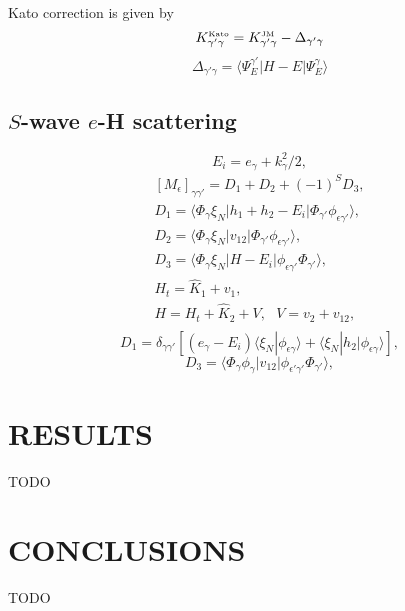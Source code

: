 \documentclass[aip
, pra
, showpacs
, aps
, twocolumn
, groupedaddress
, floatfix
]{revtex4}
\newcommand{\beq}{\begin{equation}}
\newcommand{\eeq}{\end{equation}}
\newcommand{\barr}{\begin{array}}
\newcommand{\earr}{\end{array}}
\newcommand{\JM}{\mbox{\tiny{JM}}}
\newcommand{\Kato}{\mbox{\tiny{Kato}}}
\begin{document}
Kato correction is given by
\beq
K_{\gamma' \gamma}^{\Kato} = K_{\gamma' \gamma}^{\JM} - \Delta_{\gamma' \gamma}
\eeq
\beq
\Delta_{\gamma' \gamma} = \langle \Psi_E^{\gamma'}  |H-E| \Psi_E^\gamma \rangle
\eeq

\subsection{$S$-wave $e$-H scattering}
\beq
E_i = e_\gamma + k^2_\gamma/2,
\eeq
\beq \barr{l}
[M_{\epsilon}]_{\gamma \gamma'} = D_1 + D_2 + (-1)^S D_3,\\
D_1 = \langle \Phi_\gamma \xi_{N}  | h_1 + h_2-E_i |
\Phi_{\gamma'} \phi_{\epsilon \gamma'} \rangle, \\
D_2 = \langle \Phi_\gamma \xi_{N}  | v_{12} |
\Phi_{\gamma'} \phi_{\epsilon \gamma'} \rangle, \\
D_3 = \langle \Phi_\gamma \xi_{N}  | H -E_i |
\phi_{\epsilon \gamma'} \Phi_{\gamma'}  \rangle, \\
H_t = \hat{K}_1 + v_1, \\
H = H_t + \hat{K}_2 + V, \ \ \ V = v_2 + v_{12},\\
\earr \label{Y_B_W} \eeq
\beq
D_1 = \delta_{\gamma \gamma'} [ (e_\gamma -  E_i)
\langle \xi_N | \phi_{\epsilon \gamma} \rangle + \langle \xi_N | h_2|\phi_{\epsilon \gamma} \rangle],
\eeq
\beq
D_3 =  \langle \Phi_\gamma \phi_{\gamma}  | v_{12}|
\phi_{\epsilon' \gamma'} \Phi_{\gamma'}  \rangle ,
\label{eH_ex} \eeq







\section{RESULTS}
TODO
\section{CONCLUSIONS}
TODO


\begin{acknowledgments}
\end{acknowledgments}





%
\end{document}
